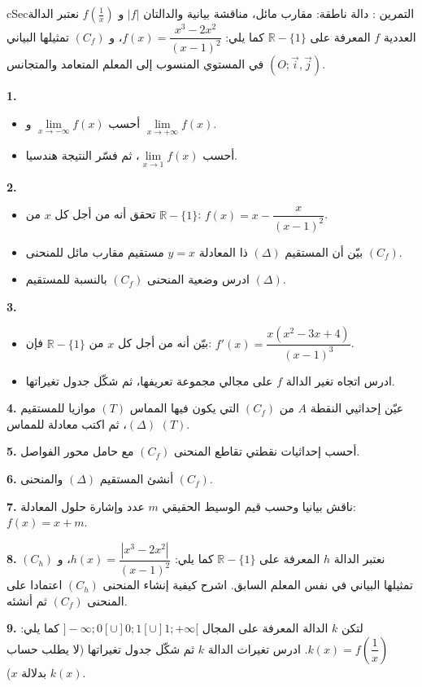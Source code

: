 \documentclass[12pt,a4paper]{article}
\newenvironment{BOX}[2]{\begin{otherlanguage}{english}\begin{arbox}{#1}{#2}}{\end{arbox}\end{otherlanguage}}
\newcounter{exo}
\newenvironment{tamrin}[1]{\stepcounter{exo}\begin{BOX}{cSec}{التمرين \theexo: #1}}{\end{BOX}}
\newcommand{\R}{\mathbb{R}}
\newenvironment{sq}{\begin{itemize}[leftmargin=2.4em,itemsep=3pt]}{\end{itemize}}
\newcommand{\qa}{\item[(أ)]}\newcommand{\qb}{\item[(ب)]}\newcommand{\qc}{\item[(جـ)]}\newcommand{\qd}{\item[(د)]}\newcommand{\qe}{\item[(هـ)]}
\newcommand{\QQ}[1]{\par\smallskip\textbf{#1.} }
\begin{document}
\begin{tamrin}{دالة ناطقة: مقارب مائل، مناقشة بيانية والدالتان $|f|$ و $f\left(\frac1x\right)$}
نعتبر الدالة العددية $f$ المعرفة على $\R-\{1\}$ كما يلي: $f(x)=\dfrac{x^{3}-2x^{2}}{(x-1)^{2}}$، و $(C_f)$ تمثيلها البياني في المستوي المنسوب إلى المعلم المتعامد والمتجانس $\left(O;\vec{i},\vec{j}\right)$.
\QQ{1}
\begin{sq}
\qa أحسب $\lim\limits_{x\to-\infty}f(x)$ و $\lim\limits_{x\to+\infty}f(x)$.
\qb أحسب $\lim\limits_{x\to1}f(x)$، ثم فسّر النتيجة هندسيا.
\end{sq}
\QQ{2}
\begin{sq}
\qa تحقق أنه من أجل كل $x$ من $\R-\{1\}$: $f(x)=x-\dfrac{x}{(x-1)^{2}}$.
\qb بيّن أن المستقيم $(\Delta)$ ذا المعادلة $y=x$ مستقيم مقارب مائل للمنحنى $(C_f)$.
\qc ادرس وضعية المنحنى $(C_f)$ بالنسبة للمستقيم $(\Delta)$.
\end{sq}
\QQ{3}
\begin{sq}
\qa بيّن أنه من أجل كل $x$ من $\R-\{1\}$ فإن: $f'(x)=\dfrac{x\left(x^{2}-3x+4\right)}{(x-1)^{3}}$.
\qb ادرس اتجاه تغير الدالة $f$ على مجالي مجموعة تعريفها، ثم شكّل جدول تغيراتها.
\end{sq}
\QQ{4} عيّن إحداثيي النقطة $A$ من $(C_f)$ التي يكون فيها المماس $(T)$ موازيا للمستقيم $(\Delta)$، ثم اكتب معادلة للمماس $(T)$.
\QQ{5} أحسب إحداثيات نقطتي تقاطع المنحنى $(C_f)$ مع حامل محور الفواصل.
\QQ{6} أنشئ المستقيم $(\Delta)$ والمنحنى $(C_f)$.
\QQ{7} ناقش بيانيا وحسب قيم الوسيط الحقيقي $m$ عدد وإشارة حلول المعادلة: $f(x)=x+m$.
\QQ{8} نعتبر الدالة $h$ المعرفة على $\R-\{1\}$ كما يلي: $h(x)=\dfrac{\left|x^{3}-2x^{2}\right|}{(x-1)^{2}}$، و $(C_h)$ تمثيلها البياني في نفس المعلم السابق. اشرح كيفية إنشاء المنحنى $(C_h)$ اعتمادا على المنحنى $(C_f)$ ثم أنشئه.
\QQ{9} لتكن $k$ الدالة المعرفة على المجال $]-\infty;0[\cup]0;1[\cup]1;+\infty[$ كما يلي: $k(x)=f\left(\dfrac1x\right)$. ادرس تغيرات الدالة $k$ ثم شكّل جدول تغيراتها (لا يطلب حساب $k(x)$ بدلالة $x$).
\end{tamrin}
\end{document}
